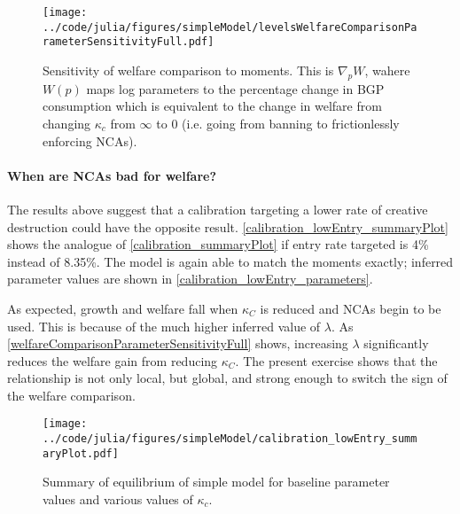 \documentclass[11pt,english]{article}
\theoremstyle{remark}
\begin{document}
\begin{figure}[]
	\texttt{[image: ../code/julia/figures/simpleModel/levelsWelfareComparisonParameterSensitivityFull.pdf]}
	\caption{Sensitivity of welfare comparison to moments. This is $\nabla_p W$, wahere $W(p)$ maps log parameters to the percentage change in BGP consumption which is equivalent to the change in welfare from changing $\kappa_c$ from $\infty$ to $0$ (i.e. going from banning to frictionlessly enforcing NCAs).}
	\label{levelsWelfareComparisonParameterSensitivityFull}
\end{figure}

\paragraph{When are NCAs bad for welfare?}

The results above suggest that a calibration targeting a lower rate of creative destruction could have the opposite result. \autoref{calibration_lowEntry_summaryPlot} shows the analogue of \autoref{calibration_summaryPlot} if entry rate targeted is 4\% instead of 8.35\%. The model is again able to match the moments exactly; inferred parameter values are shown in \autoref{calibration_lowEntry_parameters}.

As expected, growth and welfare fall when $\kappa_C$ is reduced and NCAs begin to be used. This is because of the much higher inferred value of $\lambda$. As \autoref{welfareComparisonParameterSensitivityFull} shows, increasing $\lambda$ significantly reduces the welfare gain from reducing $\kappa_C$. The present exercise shows that the relationship is not only local, but global, and strong enough to switch the sign of the welfare comparison.

\begin{figure}[]
	\texttt{[image: ../code/julia/figures/simpleModel/calibration\_lowEntry\_summaryPlot.pdf]}
	\caption{Summary of equilibrium of simple model for baseline parameter values and various values of $\kappa_c$.}
	\label{calibration_lowEntry_summaryPlot}
\end{figure}
\end{document}
